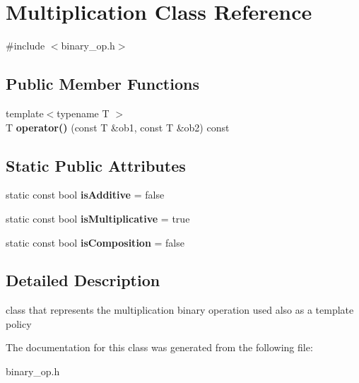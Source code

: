 \hypertarget{classMultiplication}{\section{\-Multiplication \-Class \-Reference}
\label{classMultiplication}
}


{\ttfamily \#include $<$binary\-\_\-op.\-h$>$}

\subsection*{\-Public \-Member \-Functions}
\begin{DoxyCompactItemize}
\item 
\hypertarget{classMultiplication_abc832d7341a7f4a33054e41b8a6883da}{{\footnotesize template$<$typename T $>$ }\\\-T {\bfseries operator()} (const \-T \&ob1, const \-T \&ob2) const }\label{classMultiplication_abc832d7341a7f4a33054e41b8a6883da}

\end{DoxyCompactItemize}
\subsection*{\-Static \-Public \-Attributes}
\begin{DoxyCompactItemize}
\item 
\hypertarget{classMultiplication_a37f52c627c1caa3a1ba0388de58c5dbd}{static const bool {\bfseries is\-Additive} = false}\label{classMultiplication_a37f52c627c1caa3a1ba0388de58c5dbd}

\item 
\hypertarget{classMultiplication_aaf72f7c6c05f7ed984c8e997e0505d60}{static const bool {\bfseries is\-Multiplicative} = true}\label{classMultiplication_aaf72f7c6c05f7ed984c8e997e0505d60}

\item 
\hypertarget{classMultiplication_adbcbdd5feb18d22c1765fbe1b7829840}{static const bool {\bfseries is\-Composition} = false}\label{classMultiplication_adbcbdd5feb18d22c1765fbe1b7829840}

\end{DoxyCompactItemize}


\subsection{\-Detailed \-Description}
class that represents the multiplication binary operation used also as a template policy 

\-The documentation for this class was generated from the following file\-:\begin{DoxyCompactItemize}
\item 
binary\-\_\-op.\-h\end{DoxyCompactItemize}
